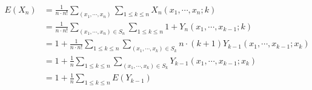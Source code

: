 \documentclass[12pt,a4paper,oneside]{report}
\begin{document}
\begin{align*}
E(X_n) 
	&= \frac{1}{n \cdot n!} \sum\limits_{(x_1, \cdots, x_n)} 
		\sum_{1 \le k \le n} X_n (x_1, \cdots, x_n ; k) \\
	&= \frac{1}{n \cdot n!} \sum\limits_{(x_1, \cdots, x_n) \in S_n}
		\sum\limits_{1 \le k \le n} 1 + Y_n (x_1, \cdots, x_{k-1} ; k) \\
	&= 1 + \frac{1}{n \cdot n!} \sum\limits_{1 \le k \le n}
		\sum\limits_{(x_1, \cdots, x_{k}) \in S_k} 
			n \cdot (k+1) Y_{k-1} (x_1, \cdots, x_{k-1}; x_k) \\
	&= 1 + \frac{1}{n} \sum\limits_{1 \le k \le n}
		\sum\limits_{(x_1, \cdots, x_{k}) \in S_k} 
			Y_{k-1} (x_1, \cdots, x_{k-1}; x_k) \\
	&= 1 + \frac{1}{n} \sum\limits_{1 \le k \le n} E(Y_{k-1})
\end{align*}

\ifx \allfiles \undefined

\printindex[noun]
\clearpage
\end{document}
